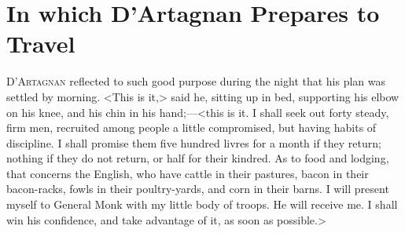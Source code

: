 \chapter{In which D'Artagnan Prepares to Travel}

\lettrine{D}{'Artagnan} reflected to such good purpose during the night that his plan was settled by morning. <This is it,> said he, sitting up in bed, supporting his elbow on his knee, and his chin in his hand;—<this is it. I shall seek out forty steady, firm men, recruited among people a little compromised, but having habits of discipline. I shall promise them five hundred livres for a month if they return; nothing if they do not return, or half for their kindred. As to food and lodging, that concerns the English, who have cattle in their pastures, bacon in their bacon-racks, fowls in their poultry-yards, and corn in their barns. I will present myself to General Monk with my little body of troops. He will receive me. I shall win his confidence, and take advantage of it, as soon as possible.>

